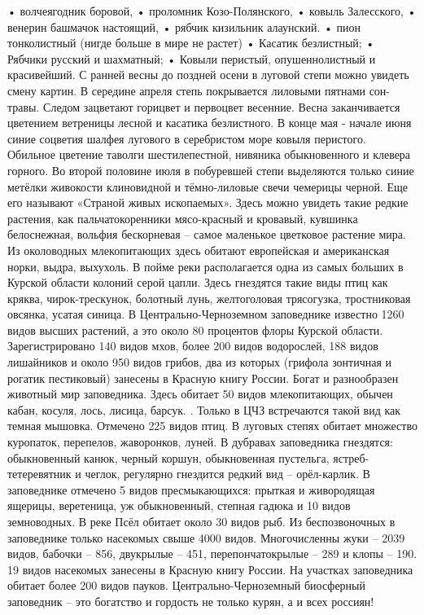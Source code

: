• волчеягодник боровой,
• проломник Козо-Полянского,  
• ковыль Залесского,
 • венерин башмачок настоящий,
• рябчик кизильник алаунский.
• пион тонколистный (нигде больше в мире не растет)     
• Касатик безлистный;
• Рябчики русский и шахматный;
• Ковыли перистый, опушеннолистный и красивейший.
        С ранней весны до поздней осени в луговой степи можно увидеть смену картин. В середине апреля степь покрывается лиловыми пятнами сон-травы. Следом зацветают горицвет и первоцвет весенние. Весна заканчивается цветением ветреницы лесной и касатика безлистного. В конце мая - начале июня синие соцветия шалфея лугового в серебристом море ковыля перистого. Обильное цветение таволги шестилепестной, нивяника обыкновенного и клевера горного.   Во второй половине июля в побуревшей степи выделяются только синие метёлки живокости клиновидной и тёмно-лиловые свечи чемерицы черной. Еще его называют «Страной живых ископаемых». Здесь можно увидеть такие редкие растения, как пальчатокоренники мясо-красный и кровавый, кувшинка белоснежная, вольфия бескорневая – самое маленькое цветковое растение мира. Из околоводных млекопитающих здесь обитают европейская и американская норки, выдра, выхухоль. В пойме реки располагается одна из самых больших в Курской области колоний серой цапли. Здесь  гнездятся такие виды птиц как кряква, чирок-трескунок, болотный лунь, желтоголовая трясогузка, тростниковая овсянка, усатая синица.
     В Центрально-Черноземном заповеднике известно 1260 видов высших растений, а это около 80 процентов флоры Курской области. Зарегистрировано 140 видов мхов, более 200 видов водорослей, 188 видов лишайников и около 950 видов грибов, два из которых (грифола зонтичная и рогатик пестиковый) занесены в Красную книгу России.
      Богат и разнообразен животный мир заповедника. Здесь обитает 50 видов млекопитающих, обычен кабан, косуля, лось, лисица, барсук. . Только в ЦЧЗ встречаются такой вид как темная мышовка. Отмечено 225 видов птиц. В луговых степях обитает множество куропаток, перепелов, жаворонков, луней. В дубравах заповедника гнездятся: обыкновенный канюк, черный коршун, обыкновенная пустельга, ястреб-тетеревятник и чеглок,  регулярно гнездится редкий вид – орёл-карлик. В заповеднике отмечено 5 видов пресмыкающихся: прыткая и живородящая ящерицы, веретеница, уж обыкновенный, степная гадюка и 10 видов земноводных. В реке Псёл обитает около 30 видов рыб. Из беспозвоночных в заповеднике только насекомых свыше 4000 видов. Многочисленны жуки – 2039 видов, бабочки – 856, двукрылые – 451, перепончатокрылые – 289 и клопы – 190. 19 видов насекомых занесены в Красную книгу России. На участках заповедника обитает более 200 видов пауков.
    Центрально-Черноземный биосферный заповедник – это богатство и гордость не только курян, а и всех россиян!
